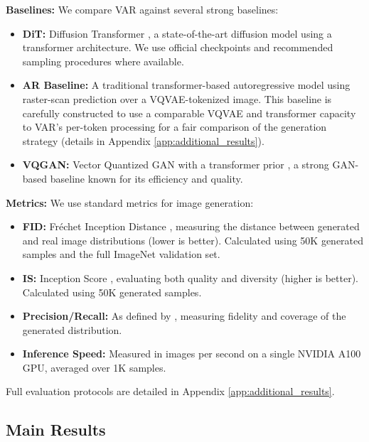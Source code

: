 \documentclass{article}
\begin{document}
\textbf{Baselines:} We compare VAR against several strong baselines:
\begin{itemize}[leftmargin=*,itemsep=2pt,topsep=3pt]
    \item \textbf{DiT:} Diffusion Transformer \cite{peebles2023scalable}, a state-of-the-art diffusion model using a transformer architecture. We use official checkpoints and recommended sampling procedures where available.
    \item \textbf{AR Baseline:} A traditional transformer-based autoregressive model using raster-scan prediction over a VQVAE-tokenized image. This baseline is carefully constructed to use a comparable VQVAE and transformer capacity to VAR's per-token processing for a fair comparison of the generation strategy (details in Appendix \ref{app:additional_results}).
    \item \textbf{VQGAN:} Vector Quantized GAN with a transformer prior \cite{esser2021taming}, a strong GAN-based baseline known for its efficiency and quality.
\end{itemize}

\textbf{Metrics:} We use standard metrics for image generation:
\begin{itemize}[leftmargin=*,itemsep=2pt,topsep=3pt]
    \item \textbf{FID:} Fréchet Inception Distance \cite{heusel2017gans}, measuring the distance between generated and real image distributions (lower is better). Calculated using 50K generated samples and the full ImageNet validation set.
    \item \textbf{IS:} Inception Score \cite{salimans2016improved}, evaluating both quality and diversity (higher is better). Calculated using 50K generated samples.
    \item \textbf{Precision/Recall:} As defined by \cite{kynkaanniemi2019improved}, measuring fidelity and coverage of the generated distribution.
    \item \textbf{Inference Speed:} Measured in images per second on a single NVIDIA A100 GPU, averaged over 1K samples.
\end{itemize}
Full evaluation protocols are detailed in Appendix \ref{app:additional_results}.

\subsection{Main Results}
\label{ssec:main_results}
\end{document}
